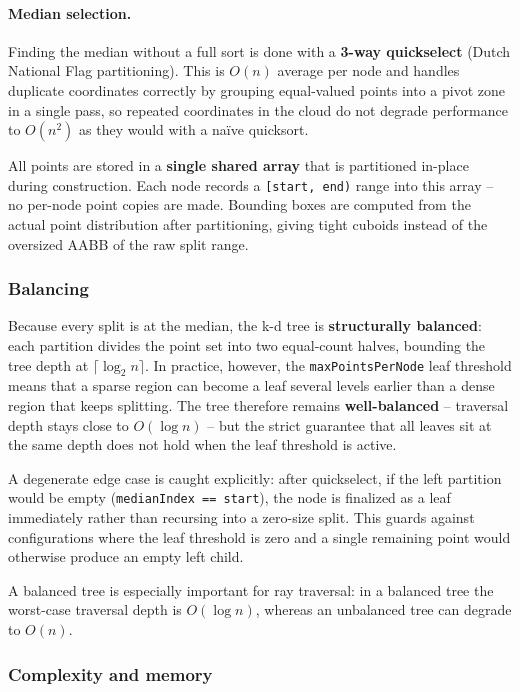 \documentclass[12pt,a4paper]{article}
\begin{document}
\paragraph{Median selection.}
Finding the median without a full sort is done with a
\textbf{3-way quickselect} (Dutch National Flag partitioning). This is
$O(n)$ average per node and handles duplicate coordinates correctly by grouping
equal-valued points into a pivot zone in a single pass, so repeated coordinates
in the cloud do not degrade performance to $O(n^2)$ as they would with a
na\"ive quicksort.

All points are stored in a \textbf{single shared array} that is partitioned
in-place during construction. Each node records a \texttt{[start, end)} range
into this array -- no per-node point copies are made. Bounding boxes are
computed from the actual point distribution after partitioning, giving tight
cuboids instead of the oversized AABB of the raw split range.

\subsubsection*{Balancing}

Because every split is at the median, the k-d tree is \textbf{structurally
balanced}: each partition divides the point set into two equal-count halves,
bounding the tree depth at $\lceil \log_2 n \rceil$. In practice, however,
the \texttt{maxPointsPerNode} leaf threshold means that a sparse region can
become a leaf several levels earlier than a dense region that keeps splitting.
The tree therefore remains \textbf{well-balanced} -- traversal depth stays
close to $O(\log n)$ -- but the strict guarantee that all leaves sit at the
same depth does not hold when the leaf threshold is active.

A degenerate edge case is caught explicitly: after quickselect, if the left
partition would be empty (\texttt{medianIndex == start}), the node is
finalized as a leaf immediately rather than recursing into a zero-size split.
This guards against configurations where the leaf threshold is zero and a
single remaining point would otherwise produce an empty left child.

A balanced tree is especially important for ray traversal: in a balanced tree
the worst-case traversal depth is $O(\log n)$, whereas an unbalanced tree can
degrade to $O(n)$.

\subsubsection*{Complexity and memory}
\end{document}
